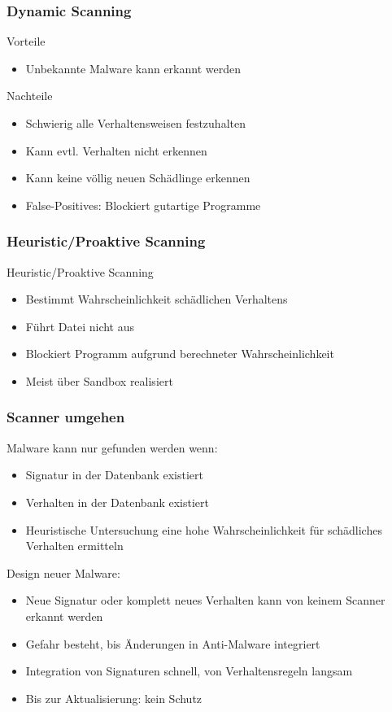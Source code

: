 \documentclass{beamer}
\begin{document}
\begin{frame}
	\frametitle{Dynamic Scanning}
	\begin{block}{Vorteile}
		\begin{itemize}
			\item Unbekannte Malware kann erkannt werden
		\end{itemize}
	\end{block} 
	\begin{block}{Nachteile}
		\begin{itemize}
			\item Schwierig alle Verhaltensweisen festzuhalten
			\item Kann evtl. Verhalten nicht erkennen
			\item Kann keine völlig neuen Schädlinge erkennen
			\item False-Positives: Blockiert gutartige Programme
		\end{itemize}
	\end{block}
\end{frame}


\begin{frame}
\frametitle{Heuristic/Proaktive Scanning}
\begin{block}{Heuristic/Proaktive Scanning}
	\begin{itemize}
		\item Bestimmt Wahrscheinlichkeit schädlichen Verhaltens
		\item Führt Datei nicht aus
		\item Blockiert Programm aufgrund berechneter Wahrscheinlichkeit
		\item Meist über Sandbox realisiert
	\end{itemize}
\end{block} 
\end{frame}

\begin{frame}
	\frametitle{Scanner umgehen}
	Malware kann nur gefunden werden wenn:
	\begin{itemize}
		\item Signatur in der Datenbank existiert
		\item Verhalten in der Datenbank existiert
		\item Heuristische Untersuchung eine hohe Wahrscheinlichkeit für schädliches Verhalten ermitteln
	\end{itemize}
	\pause
	Design neuer Malware:
	\begin{itemize}
		\item Neue Signatur oder komplett neues Verhalten kann von keinem Scanner erkannt werden
		\item Gefahr besteht, bis Änderungen in Anti-Malware integriert
		\item Integration von Signaturen schnell, von Verhaltensregeln langsam
		\item Bis zur Aktualisierung: kein Schutz
	\end{itemize}
\end{frame}
\end{document}
